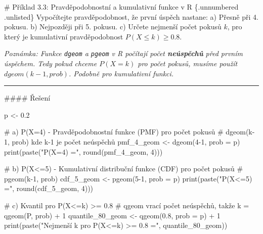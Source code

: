 \documentclass[
  czech,
  11pt,
  letterpaper,
  DIV=11,
  numbers=noendperiod]{scrreprt}
\newenvironment{Shaded}{\begin{snugshade}}{\end{snugshade}}
\newcommand{\AttributeTok}[1]{\textcolor[rgb]{0.40,0.45,0.13}{#1}}
\newcommand{\CommentTok}[1]{\textcolor[rgb]{0.37,0.37,0.37}{#1}}
\newcommand{\DecValTok}[1]{\textcolor[rgb]{0.68,0.00,0.00}{#1}}
\newcommand{\FloatTok}[1]{\textcolor[rgb]{0.68,0.00,0.00}{#1}}
\newcommand{\FunctionTok}[1]{\textcolor[rgb]{0.28,0.35,0.67}{#1}}
\newcommand{\NormalTok}[1]{\textcolor[rgb]{0.00,0.23,0.31}{#1}}
\newcommand{\OtherTok}[1]{\textcolor[rgb]{0.00,0.23,0.31}{#1}}
\newcommand{\SpecialCharTok}[1]{\textcolor[rgb]{0.37,0.37,0.37}{#1}}
\newcommand{\StringTok}[1]{\textcolor[rgb]{0.13,0.47,0.30}{#1}}
\begin{document}
\begin{tcolorbox}[enhanced jigsaw, arc=.35mm, bottomrule=.15mm, bottomtitle=1mm, breakable, colback=white, colbacktitle=quarto-callout-note-color!10!white, colframe=quarto-callout-note-color-frame, coltitle=black, left=2mm, leftrule=.75mm, opacityback=0, opacitybacktitle=0.6, rightrule=.15mm, title=\textcolor{quarto-callout-note-color}{\faInfo}\hspace{0.5em}{Poznámka}, titlerule=0mm, toprule=.15mm, toptitle=1mm]

\# Příklad 3.3: Pravděpodobnostní a kumulativní funkce v R \{.unnumbered
.unlisted\} Vypočítejte pravděpodobnost, že první úspěch nastane: a)
Přesně při 4. pokusu. b) Nejpozději při 5. pokusu. c) Určete nejmenší
počet pokusů \(k\), pro který je kumulativní pravděpodobnost
\(P(X \le k) \ge 0.8\).

\emph{Poznámka: Funkce \texttt{dgeom} a \texttt{pgeom} v R počítají
počet \textbf{neúspěchů} před prvním úspěchem. Tedy pokud chceme
\(P(X=k)\) pro počet pokusů, musíme použít \(dgeom(k-1, prob)\). Podobně
pro kumulativní funkci.}

\begin{center}\rule{0.5\linewidth}{0.5pt}\end{center}

\#\#\#\# Řešení

\begin{Shaded}
\begin{Highlighting}[]
\NormalTok{p }\OtherTok{\textless{}{-}} \FloatTok{0.2}

\CommentTok{\# a) P(X=4) {-} Pravděpodobnostní funkce (PMF) pro počet pokusů}
\CommentTok{\# dgeom(k{-}1, prob) kde k{-}1 je počet neúspěchů}
\NormalTok{pmf\_4\_geom }\OtherTok{\textless{}{-}} \FunctionTok{dgeom}\NormalTok{(}\DecValTok{4{-}1}\NormalTok{, }\AttributeTok{prob =}\NormalTok{ p)}
\FunctionTok{print}\NormalTok{(}\FunctionTok{paste}\NormalTok{(}\StringTok{"P(X=4) ="}\NormalTok{, }\FunctionTok{round}\NormalTok{(pmf\_4\_geom, }\DecValTok{4}\NormalTok{)))}

\CommentTok{\# b) P(X\textless{}=5) {-} Kumulativní distribuční funkce (CDF) pro počet pokusů}
\CommentTok{\# pgeom(k{-}1, prob)}
\NormalTok{cdf\_5\_geom }\OtherTok{\textless{}{-}} \FunctionTok{pgeom}\NormalTok{(}\DecValTok{5{-}1}\NormalTok{, }\AttributeTok{prob =}\NormalTok{ p)}
\FunctionTok{print}\NormalTok{(}\FunctionTok{paste}\NormalTok{(}\StringTok{"P(X\textless{}=5) ="}\NormalTok{, }\FunctionTok{round}\NormalTok{(cdf\_5\_geom, }\DecValTok{4}\NormalTok{)))}

\CommentTok{\# c) Kvantil pro P(X\textless{}=k) \textgreater{}= 0.8}
\CommentTok{\# qgeom vrací počet neúspěchů, takže k = qgeom(P, prob) + 1}
\NormalTok{quantile\_80\_geom }\OtherTok{\textless{}{-}} \FunctionTok{qgeom}\NormalTok{(}\FloatTok{0.8}\NormalTok{, }\AttributeTok{prob =}\NormalTok{ p) }\SpecialCharTok{+} \DecValTok{1}
\FunctionTok{print}\NormalTok{(}\FunctionTok{paste}\NormalTok{(}\StringTok{"Nejmenší k pro P(X\textless{}=k) \textgreater{}= 0.8 ="}\NormalTok{, quantile\_80\_geom))}
\end{Highlighting}
\end{Shaded}

\end{tcolorbox}
\end{document}
